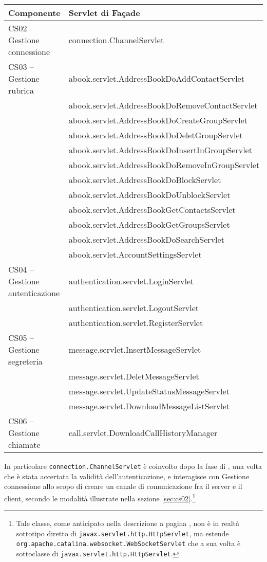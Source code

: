 \begin{description}
\begin{center}
\begin{tabular}{>{\sffamily}l>{\ttfamily}p{}}
\toprule
\textbf{\rmfamily Componente} & \textbf{\rmfamily Servlet di Façade}\\
\midrule
CS02 -- Gestione connessione & connection.ChannelServlet\\
CS03 -- Gestione rubrica & abook.servlet.AddressBookDoAddContactServlet\\
& abook.servlet.AddressBookDoRemoveContactServlet\\
& abook.servlet.AddressBookDoCreateGroupServlet\\
& abook.servlet.AddressBookDoDeletGroupServlet\\
& abook.servlet.AddressBookDoInsertInGroupServlet\\
& abook.servlet.AddressBookDoRemoveInGroupServlet\\
& abook.servlet.AddressBookDoBlockServlet\\
& abook.servlet.AddressBookDoUnblockServlet\\
& abook.servlet.AddressBookGetContactsServlet\\
& abook.servlet.AddressBookGetGroupsServlet\\
& abook.servlet.AddressBookDoSearchServlet\\
& abook.servlet.AccountSettingsServlet\\
CS04 -- Gestione autenticazione & authentication.servlet.LoginServlet\\
& authentication.servlet.LogoutServlet\\
& authentication.servlet.RegisterServlet\\
CS05 -- Gestione segreteria & message.servlet.InsertMessageServlet\\
& message.servlet.DeletMessageServlet\\
& message.servlet.UpdateStatusMessageServlet\\
& message.servlet.DownloadMessageListServlet\\
CS06 -- Gestione chiamate & call.servlet.DownloadCallHistoryManager\\
\bottomrule
\end{tabular}
\end{center}

In particolare \texttt{connection.ChannelServlet} è coinvolto dopo la fase di , una volta che è stata accertata la validità dell'autenticazione, e interagisce con \textsf{Gestione connessione} allo scopo di creare un canale di comunicazione fra il server e il client, secondo le modalità illustrate nella sezione \ref{sec:cs02}.\footnote{%
Tale classe, come anticipato nella descrizione a pagina \pageref{sec:cs02}, non è in realtà sottotipo diretto di \texttt{javax.servlet.http.HttpServlet}, ma estende \texttt{org.apache.catalina.websocket.WebSocketServlet} che a sua volta è sottoclasse di \texttt{javax.servlet.http.HttpServlet}.
}


\end{description}
